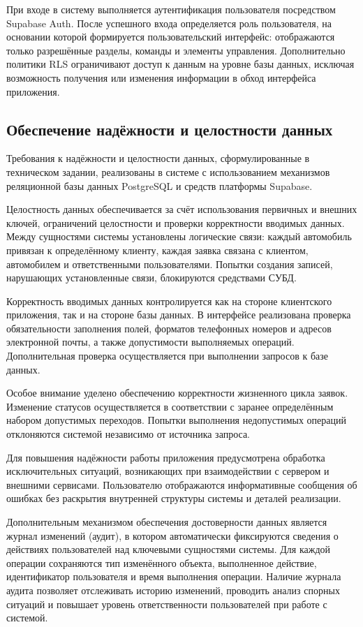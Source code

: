 При входе в систему выполняется аутентификация пользователя посредством Supabase Auth. После успешного входа определяется роль пользователя, на основании которой формируется пользовательский интерфейс: отображаются только разрешённые разделы, команды и элементы управления. Дополнительно политики RLS ограничивают доступ к данным на уровне базы данных, исключая возможность получения или изменения информации в обход интерфейса приложения.

\subsection{Обеспечение надёжности и целостности данных}

Требования к надёжности и целостности данных, сформулированные в техническом задании, реализованы в системе с использованием механизмов реляционной базы данных PostgreSQL и средств платформы Supabase.

Целостность данных обеспечивается за счёт использования первичных и внешних ключей, ограничений целостности и проверки корректности вводимых данных. Между сущностями системы установлены логические связи: каждый автомобиль привязан к определённому клиенту, каждая заявка связана с клиентом, автомобилем и ответственными пользователями. Попытки создания записей, нарушающих установленные связи, блокируются средствами СУБД.

Корректность вводимых данных контролируется как на стороне клиентского приложения, так и на стороне базы данных. В интерфейсе реализована проверка обязательности заполнения полей, форматов телефонных номеров и адресов электронной почты, а также допустимости выполняемых операций. Дополнительная проверка осуществляется при выполнении запросов к базе данных.

Особое внимание уделено обеспечению корректности жизненного цикла заявок. Изменение статусов осуществляется в соответствии с заранее определённым набором допустимых переходов. Попытки выполнения недопустимых операций отклоняются системой независимо от источника запроса.

Для повышения надёжности работы приложения предусмотрена обработка исключительных ситуаций, возникающих при взаимодействии с сервером и внешними сервисами. Пользователю отображаются информативные сообщения об ошибках без раскрытия внутренней структуры системы и деталей реализации.

Дополнительным механизмом обеспечения достоверности данных является журнал изменений (аудит), в котором автоматически фиксируются сведения о действиях пользователей над ключевыми сущностями системы. Для каждой операции сохраняются тип изменённого объекта, выполненное действие, идентификатор пользователя и время выполнения операции. Наличие журнала аудита позволяет отслеживать историю изменений, проводить анализ спорных ситуаций и повышает уровень ответственности пользователей при работе с системой.

